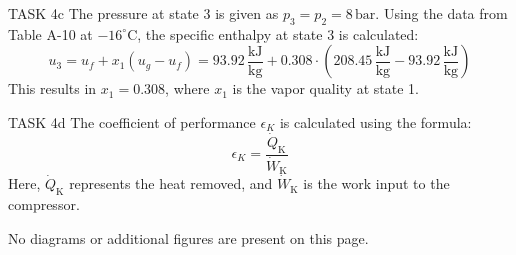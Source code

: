 TASK 4c  
The pressure at state 3 is given as \( p_3 = p_2 = 8 \, \text{bar} \). Using the data from Table A-10 at \( -16^\circ\text{C} \), the specific enthalpy at state 3 is calculated:  
\[
u_3 = u_f + x_1(u_g - u_f) = 93.92 \, \frac{\text{kJ}}{\text{kg}} + 0.308 \cdot (208.45 \, \frac{\text{kJ}}{\text{kg}} - 93.92 \, \frac{\text{kJ}}{\text{kg}})
\]  
This results in \( x_1 = 0.308 \), where \( x_1 \) is the vapor quality at state 1.  

TASK 4d  
The coefficient of performance \( \epsilon_K \) is calculated using the formula:  
\[
\epsilon_K = \frac{\dot{Q}_{\text{K}}}{\dot{W}_{\text{K}}}
\]  
Here, \( \dot{Q}_{\text{K}} \) represents the heat removed, and \( \dot{W}_{\text{K}} \) is the work input to the compressor.  

No diagrams or additional figures are present on this page.